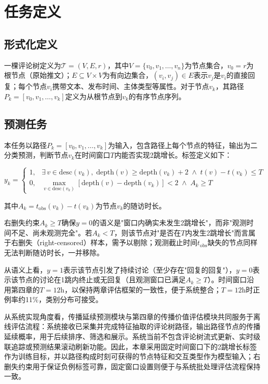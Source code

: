 \section{任务定义}

\subsection{形式化定义}

一棵评论树定义为$\mathcal{T} = (V, E, r)$，其中$V = \{v_0, v_1, \ldots, v_n\}$为节点集合，$v_0 = r$为根节点（原始推文）；$E \subseteq V \times V$为有向边集合，$(v_i, v_j) \in E$表示$v_j$是$v_i$的直接回复；每个节点$v_i$携带文本、发布时间、主体类型等属性。对于节点$v_k$，其路径$P_k = [v_0, v_1, \ldots, v_k]$定义为从根节点到$v_k$的有序节点序列。

\subsection{预测任务}

本任务以路径$P_k = [v_0, v_1, \ldots, v_k]$为输入，包含路径上每个节点的特征，输出为二分类预测，判断节点$v_k$在时间窗口$T$内能否实现2跳增长。标签定义如下：

\begin{equation}
y_k = \begin{cases}
1, & \exists\, v \in \mathrm{desc}(v_k),\; \mathrm{depth}(v) \geq \mathrm{depth}(v_k) + 2 \;\wedge\; t(v) - t(v_k) \leq T \\
0, & \max_{v \in \mathrm{desc}(v_k)}[\mathrm{depth}(v) - \mathrm{depth}(v_k)] < 2 \;\wedge\; A_k \geq T
\end{cases}
\end{equation}

其中$A_k = t_{\mathrm{obs}}(v_k) - t(v_k)$为节点$v_k$的随访时长。

右删失约束$A_k \geq T$确保$y=0$的语义是"窗口内确实未发生2跳增长"，而非"观测时间不足、尚未观测完全"。若$A_k < T$，则该节点对"是否在$T$内发生2跳增长"而言属于右删失（right-censored）\cite{wang2019machine}样本，需予以剔除；观测截止时间$t_{\text{obs}}$缺失的节点同样无法判断随访时长，一并移除。

从语义上看，$y=1$表示该节点引发了持续讨论（至少存在"回复的回复"），$y=0$表示该节点的讨论在1跳内终止或无回复（且观测窗口已满足$A_k \geq T$）。时间窗口沿用第四章的$T = 12\text{h}$，以保持两章评估框架的一致性，便于系统整合；$T=12\text{h}$时正例率约11\%，类别分布可接受。

从系统实现角度看，传播延续预测模块与第四章的传播价值评估模块共同服务于离线评估流程：系统接收已采集并完成特征抽取的评论树路径，输出路径节点的传播延续概率，用于后续排序、筛选和展示。系统当前不包含评论树流式更新、实时级联追踪或预测结果滚动刷新功能。因此，本章采用固定时间窗口下的2跳增长标签作为训练目标，并以路径构成时刻可获得的节点特征和交互类型作为模型输入；右删失约束用于保证负例标签可靠，固定窗口设置则便于与系统批处理评估流程保持一致。

